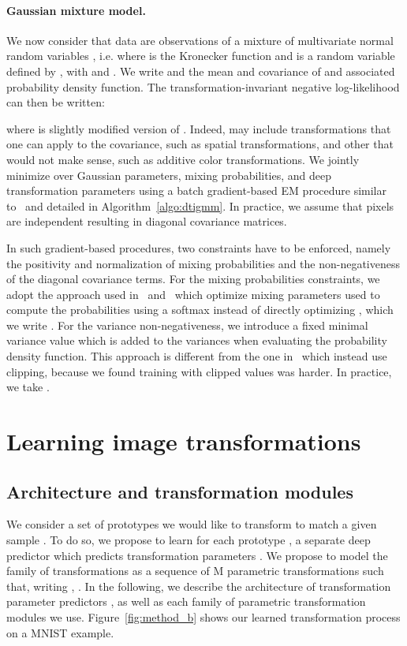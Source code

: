 \documentclass{article}
\begin{document}
\paragraph{Gaussian mixture model.}
We now consider that data are observations of a mixture of  multivariate normal random 
variables , i.e.  where  is the 
Kronecker function and  is a random variable defined by , with  and . We write  and 
 the mean and covariance of 
and  associated probability density function.  The 
transformation-invariant negative log-likelihood can then be written:

where  is slightly modified version of . Indeed,  may include 
transformations that one can apply to the covariance, such as spatial transformations, and 
other that would not make sense, such as additive color transformations. We jointly minimize 
 over Gaussian parameters, mixing probabilities, and deep 
transformation parameters  using a batch gradient-based EM procedure similar 
to~\cite{hosseiniMatrixManifoldOptimization2015,greffNeuralExpectationMaximization2017, 
gepperthGradientbasedTrainingGaussian2019} and detailed in Algorithm~\ref{algo:dtigmm}.
In practice, we assume that pixels are independent resulting in diagonal covariance matrices.  

In such gradient-based procedures, two constraints have to be enforced, namely the 
positivity and normalization of mixing probabilities  and the non-negativeness of the
diagonal covariance terms.  For the mixing probabilities constraints, we adopt the approach 
used in~\cite{hosseiniMatrixManifoldOptimization2015} 
and~\cite{gepperthGradientbasedTrainingGaussian2019} which optimize mixing parameters 
 used to compute the probabilities  using a softmax instead of directly 
optimizing , which we write . For the variance 
non-negativeness, we introduce a fixed minimal variance value  which 
is added to the variances when evaluating the probability density function. This approach is 
different from the one in~\cite{gepperthGradientbasedTrainingGaussian2019} which instead use 
clipping, because we found training with clipped values was harder. In practice, we take 
.

\section{Learning image transformations}\label{sec:learning}

\subsection{Architecture and transformation modules}
\label{sec:transfo}
We consider a set of prototypes  we would like to transform to match a given sample 
. To do so, we propose to learn for each prototype , a separate deep predictor which 
predicts transformation parameters . We propose to model the family of transformations  
 as a sequence of M parametric transformations such that, writing 
, . In the following, we describe the architecture of transformation 
parameter predictors , as well as each family of parametric transformation modules 
we use.  Figure~\ref{fig:method_b} shows our learned transformation process on a MNIST 
example.
\end{document}
